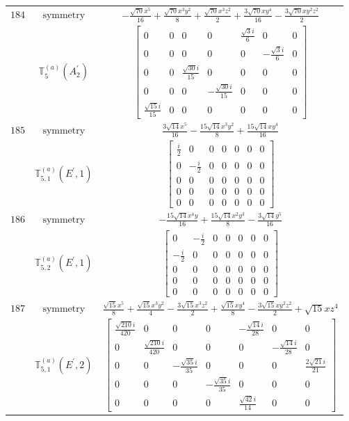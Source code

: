 \documentclass[fleqn,8pt,landscape]{jsarticle}
\begin{document}
\begin{longtable}{ccc}
$ 184 $ & $ \text{symmetry} $ & $ - \frac{\sqrt{70} x^{5}}{16} + \frac{\sqrt{70} x^{3} y^{2}}{8} + \frac{\sqrt{70} x^{3} z^{2}}{2} + \frac{3 \sqrt{70} x y^{4}}{16} - \frac{3 \sqrt{70} x y^{2} z^{2}}{2} $ \\
$  $ & $ \mathbb{T}_{5}^{(a)}(A_{2}^{\prime}) $ & $ \begin{bmatrix} 0 & 0 & 0 & 0 & \frac{\sqrt{3} i}{6} & 0 & 0 \\ 0 & 0 & 0 & 0 & 0 & - \frac{\sqrt{3} i}{6} & 0 \\ 0 & 0 & \frac{\sqrt{30} i}{15} & 0 & 0 & 0 & 0 \\ 0 & 0 & 0 & - \frac{\sqrt{30} i}{15} & 0 & 0 & 0 \\ \frac{\sqrt{15} i}{15} & 0 & 0 & 0 & 0 & 0 & 0 \end{bmatrix} $ \\ \hline
$ 185 $ & $ \text{symmetry} $ & $ \frac{3 \sqrt{14} x^{5}}{16} - \frac{15 \sqrt{14} x^{3} y^{2}}{8} + \frac{15 \sqrt{14} x y^{4}}{16} $ \\
$  $ & $ \mathbb{T}_{5,1}^{(a)}(E^{\prime},1) $ & $ \begin{bmatrix} \frac{i}{2} & 0 & 0 & 0 & 0 & 0 & 0 \\ 0 & - \frac{i}{2} & 0 & 0 & 0 & 0 & 0 \\ 0 & 0 & 0 & 0 & 0 & 0 & 0 \\ 0 & 0 & 0 & 0 & 0 & 0 & 0 \\ 0 & 0 & 0 & 0 & 0 & 0 & 0 \end{bmatrix} $ \\ \hline
$ 186 $ & $ \text{symmetry} $ & $ - \frac{15 \sqrt{14} x^{4} y}{16} + \frac{15 \sqrt{14} x^{2} y^{3}}{8} - \frac{3 \sqrt{14} y^{5}}{16} $ \\
$  $ & $ \mathbb{T}_{5,2}^{(a)}(E^{\prime},1) $ & $ \begin{bmatrix} 0 & - \frac{i}{2} & 0 & 0 & 0 & 0 & 0 \\ - \frac{i}{2} & 0 & 0 & 0 & 0 & 0 & 0 \\ 0 & 0 & 0 & 0 & 0 & 0 & 0 \\ 0 & 0 & 0 & 0 & 0 & 0 & 0 \\ 0 & 0 & 0 & 0 & 0 & 0 & 0 \end{bmatrix} $ \\ \hline
$ 187 $ & $ \text{symmetry} $ & $ \frac{\sqrt{15} x^{5}}{8} + \frac{\sqrt{15} x^{3} y^{2}}{4} - \frac{3 \sqrt{15} x^{3} z^{2}}{2} + \frac{\sqrt{15} x y^{4}}{8} - \frac{3 \sqrt{15} x y^{2} z^{2}}{2} + \sqrt{15} x z^{4} $ \\
$  $ & $ \mathbb{T}_{5,1}^{(a)}(E^{\prime},2) $ & $ \begin{bmatrix} \frac{\sqrt{210} i}{420} & 0 & 0 & 0 & - \frac{\sqrt{14} i}{28} & 0 & 0 \\ 0 & \frac{\sqrt{210} i}{420} & 0 & 0 & 0 & - \frac{\sqrt{14} i}{28} & 0 \\ 0 & 0 & - \frac{\sqrt{35} i}{35} & 0 & 0 & 0 & \frac{2 \sqrt{21} i}{21} \\ 0 & 0 & 0 & - \frac{\sqrt{35} i}{35} & 0 & 0 & 0 \\ 0 & 0 & 0 & 0 & \frac{\sqrt{42} i}{14} & 0 & 0 \end{bmatrix} $ \\ \hline

\end{longtable}
\end{document}
